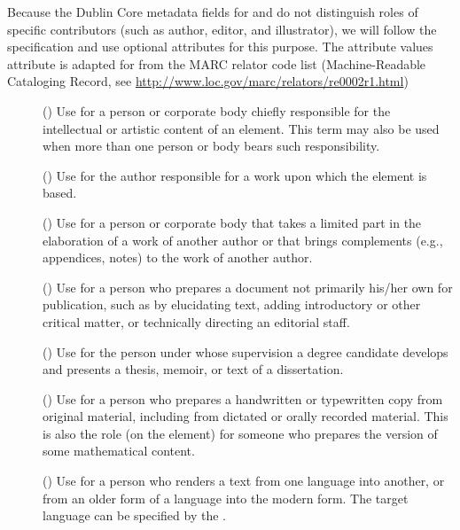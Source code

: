 Because the Dublin Core metadata fields for {} and
{} do not distinguish roles of specific contributors (such as
author, editor, and illustrator), we will follow the {}~\cite{OpenEBook:oeps99} specification and use optional
{} attributes for this purpose. The
attribute values {} attribute is adapted for {\omdoc} from
the MARC relator code list (Machine-Readable Cataloging Record, see
{\url{http://www.loc.gov/marc/relators/re0002r1.html}})
\begin{description}
\item[{}] ({}) Use for a
  person or corporate body chiefly responsible for the intellectual or artistic
  content of an element. This term may also be used when more than one person or body
  bears such responsibility.
\item[{}] ({}) Use for the author responsible
  for a work upon which the element is based.
\item[{}] ({}) Use
  for a person or corporate body that takes a limited part in the elaboration of a
  work of another author or that brings complements (e.g., appendices, notes) to
  the work of another author.
\item[{}] ({}) Use for a
  person who prepares a document not primarily his/her own for publication, such
  as by elucidating text, adding introductory or other critical matter, or
  technically directing an editorial staff.
\item[{}] ({}) Use for the person under whose supervision
  a degree candidate develops and presents a thesis, memoir, or text of a
  dissertation.
\item[{}] ({}) Use
  for a person who prepares a handwritten or typewritten copy from original
  material, including from dictated or orally recorded material. This is also the
  role (on the {} element) for someone who prepares the {\omdoc}
  version of some mathematical content.
\item[{}] ({}) Use for a
  person who renders a text from one language into another, or from an older form
  of a language into the modern form. The target language can be specified by the
  {}.
\end{description}
